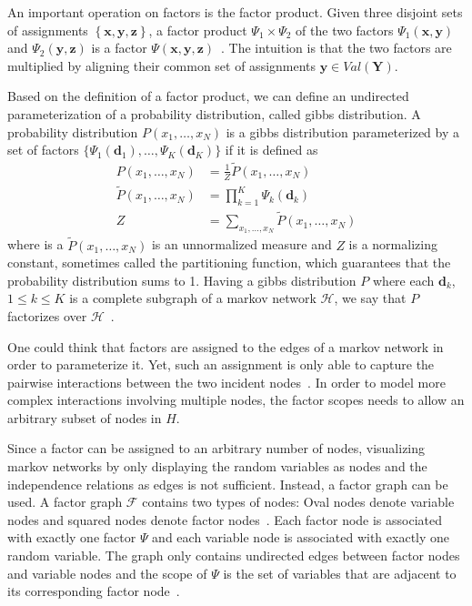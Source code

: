 An important operation on factors is the \gls{factor product}.
Given three disjoint sets of assignments $\left\{\mathbf{x}, \mathbf{y}, \mathbf{z}\right\}$, a \gls{factor product} $\Psi_1\times \Psi_2$ of the two factors $\Psi_1(\mathbf{x},\mathbf{y})$ and $\Psi_2(\mathbf{y},\mathbf{z})$ is a factor $\Psi(\mathbf{x},\mathbf{y},\mathbf{z})$~\citep{koller2009probabilistic}.
The intuition is that the two factors are multiplied by aligning their common set of assignments $\mathbf{y}\in Val(\mathbf{Y})$.

Based on the definition of a \gls{factor product}, we can define an undirected parameterization of a \gls{probability distribution}, called \gls{gibbs distribution}.
A \gls{probability distribution} $P(x_1,\dots,x_N)$ is a \gls{gibbs distribution} parameterized by a set of \glspl{factor} $\{\Psi_1(\mathbf{d}_1),\dots,\Psi_K(\mathbf{d}_K)\}$ if it is defined as~\citep{koller2009probabilistic}
\begin{equation}
  \label{equ:gibbs-distribution}
  \begin{split}
  P\left(x_1,\dots,x_N\right) & =\frac{1}{Z}\tilde{P}\left(x_1,\dots,x_N\right) \\
  \tilde{P}\left(x_1,\dots,x_N\right) & =\prod_{k=1}^{K}\Psi_k\left(\mathbf{d}_k\right) \\
  Z & =\sum_{x_1,\ldots,x_N}\tilde{P}\left(x_1,\dots,x_N\right)
  \end{split}
\end{equation}
where is a $\tilde{P}(x_1,\dots,x_N)$ is an unnormalized measure and $Z$ is a normalizing constant, sometimes called the \gls{partitioning function}, which guarantees that the \gls{probability distribution} sums to 1.
Having a \gls{gibbs distribution} $P$ where each $\mathbf{d}_k$, $1\leq k \leq K$ is a complete subgraph of a \gls{markov network} $\mathcal{H}$, we say that $P$ factorizes over $\mathcal{H}$~\citep{koller2009probabilistic}.

One could think that \glspl{factor} are assigned to the edges of a \gls{markov network} in order to parameterize it.
Yet, such an assignment is only able to capture the pairwise interactions between the two incident nodes~\citep{koller2009probabilistic}.
In order to model more complex interactions involving multiple nodes, the \glspl{factor scope} needs to allow an arbitrary subset of nodes in $H$.

Since a factor can be assigned to an arbitrary number of nodes, visualizing \glspl{markov network} by only displaying the random variables as nodes and the independence relations as edges is not sufficient.
Instead, a \gls{factor graph} can be used.
A \gls{factor graph} $\mathcal{F}$ contains two types of nodes: Oval nodes denote variable nodes and squared nodes denote factor nodes~\citep{koller2009probabilistic}.
Each factor node is associated with exactly one factor $\Psi$ and each variable node is associated with exactly one random variable.
The graph only contains undirected edges between factor nodes and variable nodes and the scope of $\Psi$ is the set of variables that are adjacent to its corresponding factor node~\citep{koller2009probabilistic}.

